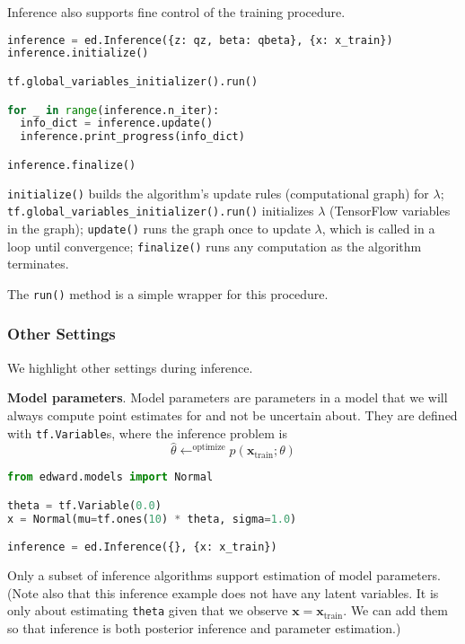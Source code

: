 Inference also supports fine control of the training procedure.

\begin{lstlisting}[language=Python]
inference = ed.Inference({z: qz, beta: qbeta}, {x: x_train})
inference.initialize()

tf.global_variables_initializer().run()

for _ in range(inference.n_iter):
  info_dict = inference.update()
  inference.print_progress(info_dict)

inference.finalize()
\end{lstlisting}

\texttt{initialize()} builds the algorithm's update rules
(computational graph) for $\lambda$;
\texttt{tf.global_variables_initializer().run()} initializes $\lambda$
(TensorFlow variables in the graph);
\texttt{update()} runs the graph once to update
$\lambda$, which is called in a loop until convergence;
\texttt{finalize()} runs any computation as the algorithm
terminates.

The \texttt{run()} method is a simple wrapper for this procedure.

\subsubsection{Other Settings}

We highlight other settings during inference.

\textbf{Model parameters}.
Model parameters are parameters in a model that we will always compute
point estimates for and not be uncertain about.
They are defined with \texttt{tf.Variable}s, where the inference
problem is
\begin{equation*}
\hat{\theta} \leftarrow^{\text{optimize}}
p(\mathbf{x}_{\text{train}}; \theta)
\end{equation*}

\begin{lstlisting}[language=Python]
from edward.models import Normal

theta = tf.Variable(0.0)
x = Normal(mu=tf.ones(10) * theta, sigma=1.0)

inference = ed.Inference({}, {x: x_train})
\end{lstlisting}

Only a subset of inference algorithms support estimation of model
parameters.
(Note also that this inference example does not have any latent
variables. It is only about estimating \texttt{theta} given that we
observe $\mathbf{x} = \mathbf{x}_{\text{train}}$. We can add them so
that inference is both posterior inference and parameter estimation.)

